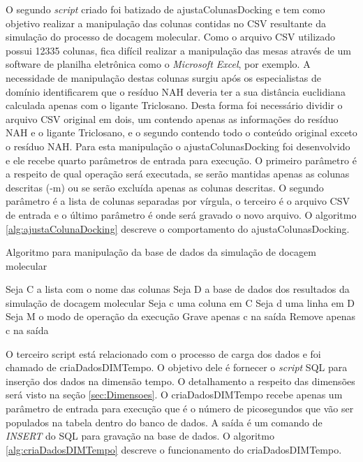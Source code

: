 O segundo \emph{script} criado foi batizado de ajustaColunasDocking e tem como objetivo realizar a manipulação das colunas contidas no CSV resultante da simulação do processo de docagem molecular. Como o arquivo CSV utilizado possui 12335 colunas, fica difícil realizar a manipulação das mesas através de um software de planilha eletrônica como o \emph{Microsoft Excel}, por exemplo. A necessidade de manipulação destas colunas surgiu após os especialistas de domínio identificarem que o resíduo NAH deveria ter a sua distância euclidiana calculada apenas com o ligante Triclosano. Desta forma foi necessário dividir o arquivo CSV original em dois, um contendo apenas as informações do resíduo NAH e o ligante Triclosano, e o segundo contendo todo o conteúdo original exceto o resíduo NAH. Para esta manipulação o ajustaColunasDocking foi desenvolvido e ele recebe quarto parâmetros de entrada para execução. O primeiro parâmetro é a respeito de qual operação será executada, se serão mantidas apenas as colunas descritas (-m) ou se serão excluída apenas as colunas descritas. O segundo parâmetro é a lista de colunas separadas por vírgula, o terceiro é o arquivo CSV de entrada e o último parâmetro é onde será gravado o novo arquivo. O algoritmo \ref{alg:ajustaColunaDocking} descreve o comportamento do ajustaColunasDocking.

\begin{algorithm}[H]
\caption{Algoritmo para manipulação da base de dados da simulação de docagem molecular}
\label{alg:ajustaColunaDocking}
{\fontsize{10}{10}\selectfont
\begin{algorithmic}[1]
	\STATE Seja C a lista com o nome das colunas
	\STATE Seja D a base de dados dos resultados da simulação de docagem molecular
	\STATE Seja c uma coluna em C
	\STATE Seja d uma linha em D
	\STATE Seja M o modo de operação da execução
			\STATE Grave apenas c na saída
			\ENDFOR
		\ENDFOR
	\ENDIF
			\STATE Remove apenas c na saída
			\ENDFOR
		\ENDFOR
	\ENDIF
\end{algorithmic}
}
\end{algorithm}

\newpage

O terceiro script está relacionado com o processo de carga dos dados e foi chamado de criaDadosDIMTempo. O objetivo dele é fornecer o \emph{script} SQL para inserção dos dados na dimensão tempo. O detalhamento a respeito das dimensões será visto na seção \ref{sec:Dimensoes}. O criaDadosDIMTempo recebe apenas um parâmetro de entrada para execução que é o número de picosegundos que vão ser populados na tabela dentro do banco de dados. A saída é um comando de \emph{INSERT} do SQL para gravação na base de dados. O algoritmo \ref{alg:criaDadosDIMTempo} descreve o funcionamento do criaDadosDIMTempo.

